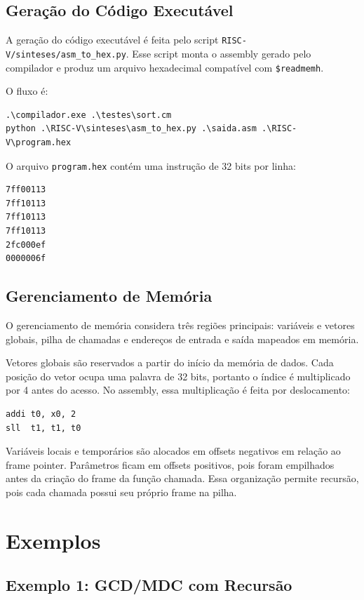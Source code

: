 \documentclass[12pt,a4paper]{report}
\begin{document}
\section{Geração do Código Executável}

A geração do código executável é feita pelo script \texttt{RISC-V/sinteses/asm\_to\_hex.py}. Esse script monta o assembly gerado pelo compilador e produz um arquivo hexadecimal compatível com \texttt{\$readmemh}.

O fluxo é:

\begin{lstlisting}
.\compilador.exe .\testes\sort.cm
python .\RISC-V\sinteses\asm_to_hex.py .\saida.asm .\RISC-V\program.hex
\end{lstlisting}

O arquivo \texttt{program.hex} contém uma instrução de 32 bits por linha:

\begin{lstlisting}
7ff00113
7ff10113
7ff10113
7ff10113
2fc000ef
0000006f
\end{lstlisting}

\section{Gerenciamento de Memória}

O gerenciamento de memória considera três regiões principais: variáveis e vetores globais, pilha de chamadas e endereços de entrada e saída mapeados em memória.

Vetores globais são reservados a partir do início da memória de dados. Cada posição do vetor ocupa uma palavra de 32 bits, portanto o índice é multiplicado por 4 antes do acesso. No assembly, essa multiplicação é feita por deslocamento:

\begin{lstlisting}
addi t0, x0, 2
sll  t1, t1, t0
\end{lstlisting}

Variáveis locais e temporários são alocados em offsets negativos em relação ao frame pointer. Parâmetros ficam em offsets positivos, pois foram empilhados antes da criação do frame da função chamada. Essa organização permite recursão, pois cada chamada possui seu próprio frame na pilha.

\chapter{Exemplos}

\section{Exemplo 1: GCD/MDC com Recursão}
\end{document}
